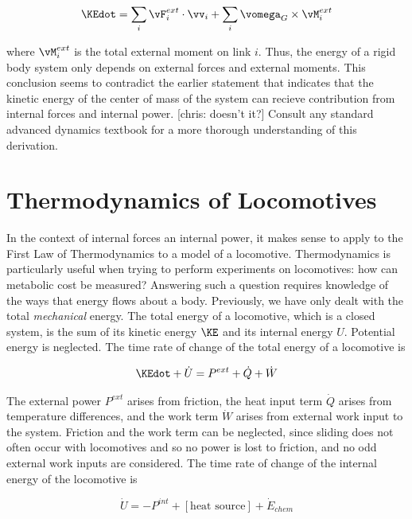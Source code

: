 \begin{equation}
\KEdot = \sum_{i} \vF_{i}^{ext} \cdot \vv_{i} + \sum_{i} \vomega_{G} \times \vM_{i}^{ext}
\end{equation}

where $\vM_{i}^{ext}$ is the total external moment on link $i$. Thus, the energy of a rigid body system only depends on external forces and external moments. This conclusion seems to contradict the earlier statement that indicates that the kinetic energy of the center of mass of the system can recieve contribution from internal forces and internal power. [chris: doesn't it?] Consult any standard advanced dynamics textbook for a more thorough understanding of this derivation.

\section{Thermodynamics of Locomotives}
\label{sec:ThermodynamicsofLocomotives}

In the context of internal forces an internal power, it makes sense to apply to the First Law of Thermodynamics to a model of a locomotive. Thermodynamics is particularly useful when trying to perform experiments on locomotives: how can metabolic cost be measured? Answering such a question requires knowledge of the ways that energy flows about a body. Previously, we have only dealt with the total \emph{mechanical} energy. The total energy of a locomotive, which is a closed system, is the sum of its kinetic energy $\KE$ and its internal energy $U$. Potential energy is neglected. The time rate of change of the total energy of a locomotive is

\begin{equation}
\KEdot + \dot{U} = P^{ext} + \dot{Q} + \dot{W}
\label{eq:Thermodynamics1}
\end{equation}

The external power $P^{ext}$ arises from friction, the heat input term $\dot{Q}$ arises from temperature differences, and the work term $\dot{W}$ arises from external work input to the system. Friction and the work term can be neglected, since sliding does not often occur with locomotives and so no power is lost to friction, and no odd external work inputs are considered. The time rate of change of the internal energy of the locomotive is

\begin{equation}
\dot{U} = -P^{int} + [\mbox{heat source}] + \dot{E}_{chem}
\label{eq:Thermodynamics2}
\end{equation}

